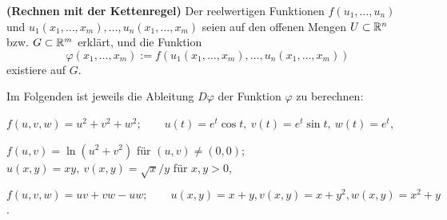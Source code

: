 \begin{Problem}
	\textbf{(Rechnen mit der Kettenregel)} Der reelwertigen Funktionen $f(u_1,\dots, u_n)$ und $u_1(x_1,\dots, x_m),\dots, u_n(x_1,\dots, x_m)$ seien auf den offenen Mengen $U\subset \mathbb{R}^n$ bzw. $G\subset \mathbb{R}^m$ erklärt, und die Funktion
	\[
	\varphi(x_1,\dots, x_m):=f(u_1(x_1,\dots, x_m),\dots, u_n(x_1,\dots, x_m))
\]
existiere auf $G$.

Im Folgenden ist jeweils die Ableitung $D\varphi$ der Funktion $\varphi$ zu berechnen:
\begin{parts}
\item $f(u,v,w)=u^2+v^2+w^2;\qquad u(t)=e^t\cos t,~v(t)=e^t\sin t,~w(t)=e^t$,
\item $f(u,v)=\ln(u^2+v^2)$ f\"{u}r $(u,v)\neq (0,0)$; $u(x,y)=xy,~v(x,y)=\sqrt{x} / y$ f\"{u}r $x,y>0$,
\item $f(u,v,w)=uv+vw-uw;\qquad u(x,y)=x+y,v(x,y)=x+y^2,w(x,y)=x^2+y$.
\end{parts}
\end{Problem}
